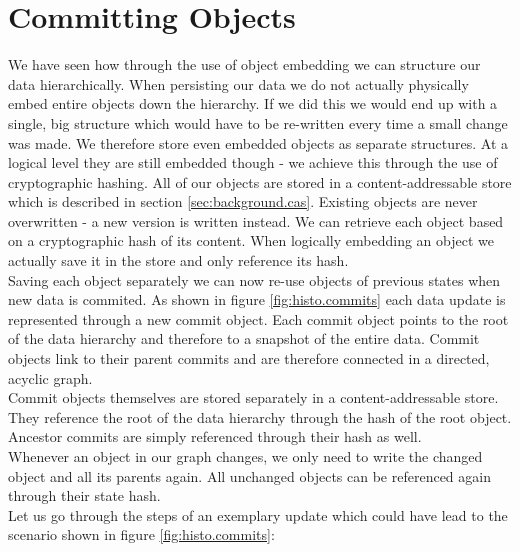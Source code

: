
\section{Committing Objects}
\label{sec:main.committing}
We have seen how through the use of object embedding we can structure our data hierarchically.
When persisting our data we do not actually physically embed entire objects down the hierarchy.
If we did this we would end up with a single, big structure which would have to be re-written every time a small change was made.
We therefore store even embedded objects as separate structures.
At a logical level they are still embedded though - we achieve this through the use of cryptographic hashing.
All of our objects are stored in a content-addressable store which is described in section \ref{sec:background.cas}.
Existing objects are never overwritten - a new version is written instead.
We can retrieve each object based on a cryptographic hash of its content.
When logically embedding an object we actually save it in the store and only reference its hash.\\
Saving each object separately we can now re-use objects of previous states when new data is commited.
As shown in figure \ref{fig:histo.commits} each data update is represented through a new commit object.
Each commit object points to the root of the data hierarchy and therefore to a snapshot of the entire data.
Commit objects link to their parent commits and are therefore connected in a directed, acyclic graph.\\
Commit objects themselves are stored separately in a content-addressable store.
They reference the root of the data hierarchy through the hash of the root object.
Ancestor commits are simply referenced through their hash as well.\\
Whenever an object in our graph changes, we only need to write the changed object and all its parents again.
All unchanged objects can be referenced again through their state hash.\\

Let us go through the steps of an exemplary update which could have lead to the scenario shown in figure \ref{fig:histo.commits}:

